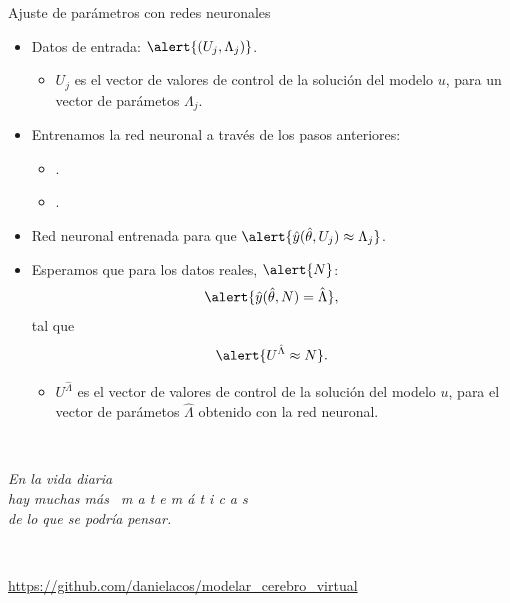 \documentclass[
  unknownkeysallowed %
]{beamer}
\begin{document}
\begin{frame}{Ajuste de parámetros con redes neuronales}
  \begin{itemize}
    \item<1-> Datos de entrada: $\alert{(U_j,\Lambda_j)}$.
    \begin{itemize}
      \item $U_j$ es el vector de valores de control de la solución del modelo $u$, para un vector de parámetos $\Lambda_j$.
    \end{itemize}
    \item<2-> Entrenamos la red neuronal a través de los pasos anteriores:
    \begin{itemize}
      \item {}.
      \item {}.
    \end{itemize}
    \item<2-> Red neuronal entrenada para que $\alert{\hat y(\hat \theta,U_j)\approx \Lambda_j}$.
    \item<3-> Esperamos que para los datos reales, $\alert{N}$:
    $$
    \alert{\hat y(\hat \theta,N)= \hat\Lambda},
    $$
    tal que
    $$
    \alert{U^{\hat\Lambda}\approx N}.
    $$
    \begin{itemize}
      \item $U^{\hat\Lambda}$ es el vector de valores de control de la solución del modelo $u$, para el vector de parámetos $\hat\Lambda$ obtenido con la red neuronal.
    \end{itemize}
  \end{itemize}
\end{frame}

\begin{frame}{~}
  \begin{flushleft}\em
    En la vida diaria
    \\[1.2em]
    hay muchas más \ \alert{\large m a t e m á t i c a s}
    \\[1.2em]
    de lo que se podría pensar.
  \end{flushleft}
  \bigskip
  \begin{flushright}
    \Huge{}
  \end{flushright}
  \vfill
  \vfill
  ~
  \begin{flushright}
    \color{gray}\scriptsize\url{https://github.com/danielacos/modelar_cerebro_virtual}
  \end{flushright}
\end{frame}
\end{document}
